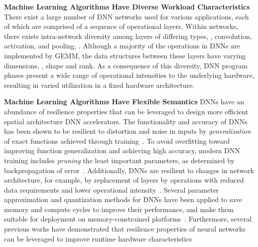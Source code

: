 \textbf{Machine Learning Algorithms Have Diverse Workload Characteristics}
There exist a large number of DNN networks used for various applications, each of which are comprised of a sequence of operational layers.
Within networks, there exists intra-network diversity among layers of differing types, \eg, convolution, activation, and pooling, \etc.
Although a majority of the operations in DNNs are implemented by GEMM, the data structures between these layers have varying dimensions, \ie, shape and rank.
As a consequence of this diversity, DNN program phases present a wide range of operational intensities to the underlying hardware, resulting in varied utilization in a fixed hardware architecture.

\textbf{Machine Learning Algorithms Have Flexible Semantics}
DNNs have an abundance of resilience properties that can be leveraged to design more efficient spatial architecture DNN accelerators.
The functionality and accuracy of DNNs has been shown to be resilient to distortion and noise in inputs by \textit{generalization} of exact functions achieved through training~\cite{cheng2017maximum, dodge2017quality, szegedy2013intriguiing, zhou2017classification}.
To avoid overfitting toward improving function generalization and achieving high accuracy, modern DNN training includes \textit{pruning} the least important parameters, as determined by backpropagation of error~\cite{molchanov2016pruning, srivastava2014dropout, han2015learning}.
Additionally, DNNs are resilient to changes in network architecture, for example, by replacement of layers by operations with reduced data requirements and lower operational intensity~\cite{lin2013network, szegedy2015going}.
Several parameter approximation and quantization methods for DNNs have been applied to save memory and compute cycles to improve their performance, and make them suitable for deployment on memory-constrained platforms~\cite{vanhoucke2011improving, denton2014exploiting, gong2014compressing}.
Furthermore, several previous works have demonstrated that resilience properties of neural networks can be leveraged to improve runtime hardware characteristics~\cite{du2014leveraging, venkataramani2013quality, yu2017scalpel}

